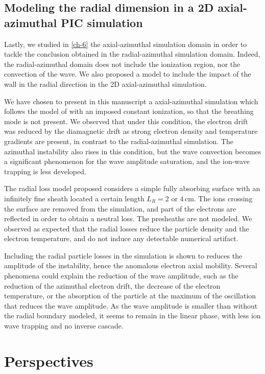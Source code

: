   \subsection{Modeling the radial dimension in a 2D axial-azimuthal PIC simulation}

    Lastly, we studied in \cref{ch-6} the axial-azimuthal simulation domain in order to tackle the conclusion obtained in the radial-azimuthal simulation domain.
    Indeed, the radial-azimuthal domain does not include the ionization region, nor the convection of the wave.
    We also proposed a model to include the impact of the wall in the radial direction in the 2D axial-azimuthal simulation.

    We have chosen to present in this manuscript a axial-azimuthal simulation which follows the model of \citet{boeuf2018} with an imposed constant ionization, so that the breathing mode is not present.
    We observed that under this condition, the electron drift was reduced by the diamagnetic drift as strong electron density and temperature gradients are present, in contrast to the radial-azimuthal simulation.
    The azimuthal instability also rises in this condition, but the wave convection becomes a significant phenomenon for the wave amplitude saturation, and the ion-wave trapping is less developed.

    The radial loss model proposed considers a simple fully absorbing surface with an infinitely fine sheath located a certain length $L_R=2$ or $4$\,cm.
    The ions crossing the surface are removed from the simulation, and part of the electrons are reflected in order to obtain a neutral loss.
    The presheaths are not modeled.
    We observed as expected that the radial losses reduce the particle density and the electron temperature, and do not induce any detectable numerical artifact.
    
    
    Including the radial particle losses in the simulation is shown to reduces the amplitude of the instability, hence the anomalous electron axial mobility.
    Several phenomena could explain the reduction of the wave amplitude, such as the reduction of the azimuthal electron drift, the decrease of the electron temperature, or the absorption of the particle at the maximum of the oscillation that reduces the wave amplitude.
    As the wave amplitude is smaller than without the radial boundary modeled, it seems to remain in the linear phase, with less ion wave trapping and no inverse cascade.

\section{Perspectives}

